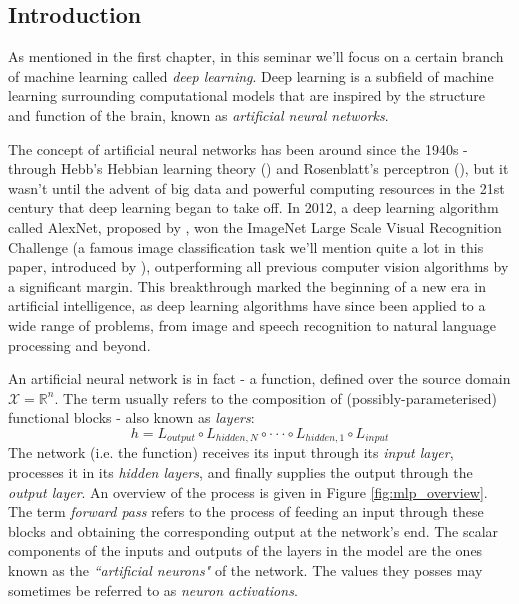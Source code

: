 \documentclass{article}
\begin{document}
\subsection{Introduction}
\label{sec:dl-intro}

As mentioned in the first chapter, in this seminar we'll focus on a certain branch of machine learning called \emph{deep learning}. Deep learning is a subfield of machine learning surrounding computational models that are inspired by the structure and function of the brain, known as \emph{artificial neural networks}.

\medskip
\noindent
The concept of artificial neural networks has been around since the 1940s - through Hebb's Hebbian learning theory (\citet{do1949organization}) and Rosenblatt's perceptron (\citet{rosenblatt1958perceptron}), but it wasn't until the advent of big data and powerful computing resources in the 21st century that deep learning began to take off. In 2012, a deep learning algorithm called AlexNet, proposed by \citet{alex2012alexnet}, won the ImageNet Large Scale Visual Recognition Challenge (a famous image classification task we'll mention quite a lot in this paper, introduced by \citet{deng2009imagenet}), outperforming all previous computer vision algorithms by a significant margin. This breakthrough marked the beginning of a new era in artificial intelligence, as deep learning algorithms have since been applied to a wide range of problems, from image and speech recognition to natural language processing and beyond.

\medskip
\noindent
An artificial neural network is in fact - a function, defined over the source domain $\mathcal{X} = \mathbb{R}^n$. The term usually refers to the composition of (possibly-parameterised) functional blocks - also known as \emph{layers}:
\begin{equation*}
    h = L_{output} \circ L_{hidden,N} \circ \cdot\cdot\cdot \circ L_{hidden,1} \circ L_{input}
\end{equation*}
The network (i.e. the function) receives its input through its \emph{input layer}, processes it in its \emph{hidden layers}, and finally supplies the output through the \emph{output layer}. An overview of the process is given in Figure \ref{fig:mlp_overview}. The term \emph{forward pass} refers to the process of feeding an input through these blocks and obtaining the corresponding output at the network's end. The scalar components of the inputs and outputs of the layers in the model are the ones known as the \emph{``artificial neurons"} of the network. The values they posses may sometimes be referred to as \emph{neuron activations}. 
\end{document}
